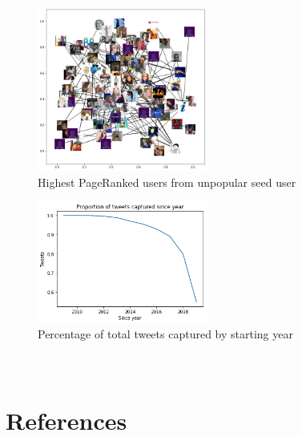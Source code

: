 \documentclass[11pt]{article}
\begin{document}
\begin{figure}[h!]
    \centering
     \includegraphics[width=0.5\textwidth]{nxgraph_unpopular_seed}
        \caption{Highest PageRanked users from unpopular seed user}
\end{figure}

\begin{figure}[h!]
    \centering
     \includegraphics[width=0.5\textwidth]{tweets_since_year}
        \caption{Percentage of total tweets captured by starting year}
\end{figure}

\section{\\References}
\end{document}
